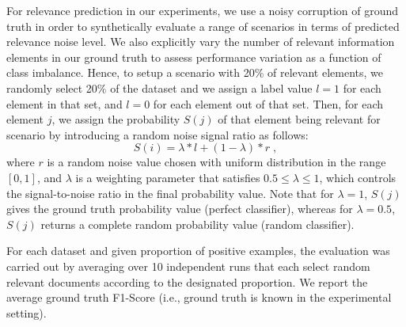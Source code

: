 For relevance prediction in our experiments, we use a noisy corruption of ground truth in order to synthetically evaluate a range of scenarios in terms of predicted relevance noise level.
We also explicitly vary the number of relevant information elements in our ground truth to assess performance variation as a function of class imbalance.  Hence, to setup a scenario with 20\% of relevant elements, we randomly select 20\% of the dataset and we assign a label value $l=1$ for each element in that set, and $l=0$ for each element out of that set. Then, for each element $j$, we assign the probability $S(j)$ of that element being relevant for scenario by introducing a random noise signal ratio as follows:
\begin{equation}
S(i) = \lambda*l+(1-\lambda)*r \; ,
\end{equation}
where $r$ is a random noise value chosen with uniform distribution in the range $[0,1]$, and $\lambda$ is a weighting parameter  that satisfies $0.5 \leq \lambda \leq 1$, which controls the signal-to-noise ratio in the final probability value. Note that for $\lambda=1$, $S(j)$ gives the ground truth probability value (perfect classifier), whereas for $\lambda=0.5$, $S(j)$ returns a complete random probability value (random classifier).


For each dataset and given proportion of positive examples, the evaluation was carried out by averaging over 10 independent runs that each select random relevant documents according to the designated proportion.  We report the average ground truth F1-Score (i.e., ground truth is known in the experimental setting).




